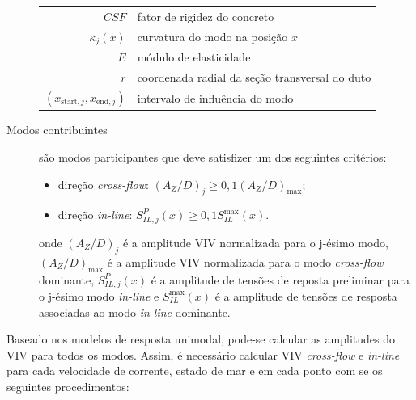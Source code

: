 \begin{description}
    \begin{tabular}{rl}
        $\mathit{CSF}$                            & fator de rigidez do concreto\\
        $\kappa_{j}(x)$                           & curvatura do modo na posição $x$\\
        $E$                                       & módulo de elasticidade\\
        $r$                                       & coordenada radial da seção transversal do duto\\
        $(x_{\text{start},j}, x_{\text{end}, j})$ & intervalo de influência do modo
    \end{tabular}

	\item [Modos contribuintes] são modos participantes que deve satisfizer um dos seguintes critérios:

        \begin{itemize}
    	\item direção \textit{cross-flow}: ${(A_Z/D)}_j \geq 0,1{(A_Z/D)}_{\max}$;

        \item direção \textit{in-line}: $S_{\mathit{IL}, \mathit{j}}^{P}(x) \geq 0,1 S_\mathit{IL}^{\max}(x)$.
        \end{itemize}

	onde ${(A_Z/D)}_j$ é a amplitude VIV normalizada para o j-ésimo modo, ${(A_Z/D)}_{\max}$ é a amplitude VIV normalizada para o modo \textit{cross-flow}  dominante, $S_{\mathit{IL}, \mathit{j}}^{P}(x)$ é a amplitude de tensões de reposta preliminar para o j-ésimo modo \textit{in-line} e $S_\mathit{IL}^{\max}(x)$ é a amplitude de tensões de resposta associadas ao modo \textit{in-line} dominante.

\end{description}

Baseado nos modelos de resposta unimodal, pode-se calcular as amplitudes do VIV para todos os modos.
Assim, é necessário calcular VIV \textit{cross-flow} e \textit{in-line} para cada velocidade de corrente, estado de mar e em cada ponto com se os seguintes procedimentos:

